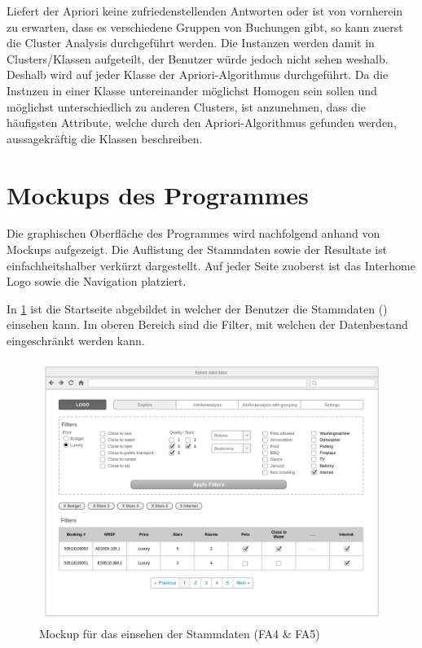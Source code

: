 Liefert der Apriori keine zufriedenstellenden Antworten oder ist von vornherein zu erwarten, dass es verschiedene Gruppen von Buchungen gibt, so kann zuerst die Cluster Analysis durchgeführt werden. Die Instanzen werden damit in Clusters/Klassen aufgeteilt, der Benutzer würde jedoch nicht sehen weshalb. Deshalb wird auf jeder Klasse der Apriori-Algorithmus durchgeführt. Da die Instnzen in einer Klasse untereinander möglichst Homogen sein sollen und möglichst unterschiedlich zu anderen Clusters, ist anzunehmen, dass die häufigsten Attribute, welche durch den Apriori-Algorithmus gefunden werden, aussagekräftig die Klassen beschreiben.

\section{Mockups des Programmes}
\label{sec:konzept:mockups}
Die graphischen Oberfläche des Programmes wird nachfolgend anhand von Mockups aufgezeigt. Die Auflistung der Stammdaten sowie der Resultate ist einfachheitshalber verkürzt dargestellt. Auf jeder Seite zuoberst ist das Interhome Logo sowie die Navigation platziert.

In \cref{fig:konzept:mockups:stammdaten} ist die Startseite abgebildet in welcher der Benutzer die Stammdaten () einsehen kann. Im oberen Bereich sind die Filter, mit welchen der Datenbestand eingeschränkt werden kann. 
\begin{figure}[H]
	\RawFloats
	\centering
	\includegraphics[width=1\textwidth]{images/wireframe-explore}
	\caption{Mockup für das einsehen der Stammdaten (FA4 \& FA5)}
	\label{fig:konzept:mockups:stammdaten}
\end{figure}

